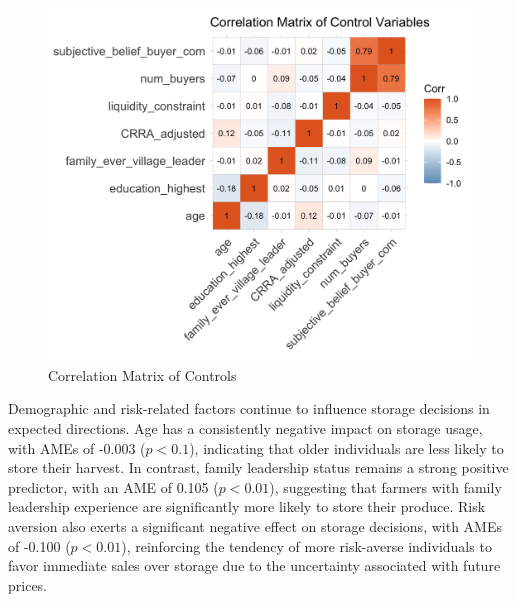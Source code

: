 \begin{figure}[ht]
\centering
\includegraphics[width=1\textwidth]{figures/correlation_matrix_controls.png}
\caption{Correlation Matrix of Controls}
\label{Figure: Correlation Matrix of Controls}
\end{figure}

Demographic and risk-related factors continue to influence storage decisions in expected directions. Age has a consistently negative impact on storage usage, with AMEs of -0.003 (\(p < 0.1\)), indicating that older individuals are less likely to store their harvest. In contrast, family leadership status remains a strong positive predictor, with an AME of 0.105 (\(p < 0.01\)), suggesting that farmers with family leadership experience are significantly more likely to store their produce. Risk aversion also exerts a significant negative effect on storage decisions, with AMEs of -0.100 (\(p < 0.01\)), reinforcing the tendency of more risk-averse individuals to favor immediate sales over storage due to the uncertainty associated with future prices.

